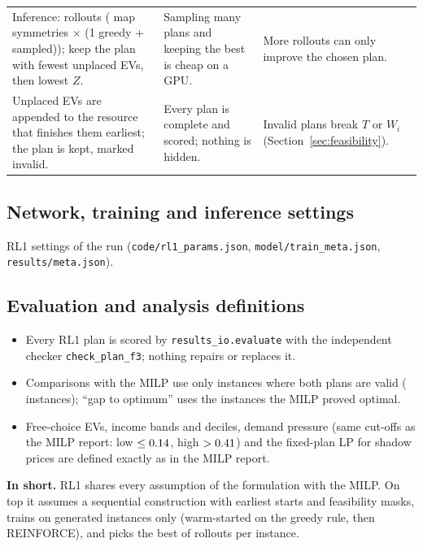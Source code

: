 \documentclass[11pt,a4paper]{article}
\newcommand{\inshort}[1]{\begin{insum}\textbf{In short.} #1\end{insum}}
\begin{document}
\begin{xltabular}{\textwidth}{@{}>{\raggedright\arraybackslash}p{4.4cm}>{\raggedright\arraybackslash}p{5.2cm}X@{}}
Inference: \Rollouts{} rollouts (\Augment{} map symmetries $\times$ (1 greedy + \Samples{} sampled)); keep the plan with fewest unplaced EVs, then lowest $Z$. & Sampling many plans and keeping the best is cheap on a GPU. & More rollouts can only improve the chosen plan. \\
Unplaced EVs are appended to the resource that finishes them earliest; the plan is kept, marked invalid. & Every plan is complete and scored; nothing is hidden. & Invalid plans break $T$ or $W_i$ (Section~\ref{sec:feasibility}). \\
\bottomrule
\end{xltabular}

\subsection{Network, training and inference settings}
\begin{table}[H]
\centering\small
\caption{RL1 settings of the run (\texttt{code/rl1\_params.json}, \texttt{model/train\_meta.json}, \texttt{results/meta.json}).}
\label{tab:settings}

\end{table}

\subsection{Evaluation and analysis definitions}
\begin{itemize}
  \item Every RL1 plan is scored by \texttt{results\_io.evaluate} with the independent checker \texttt{check\_plan\_f3}; nothing repairs or replaces it.
  \item Comparisons with the MILP use only instances where both plans are valid (\NBoth{} instances); ``gap to optimum'' uses the \NGapOpt{} instances the MILP proved optimal.
  \item Free-choice EVs, income bands and deciles, demand pressure (same cut-offs as the MILP report: low $\le0.14$, high $>0.41$) and the fixed-plan LP for shadow prices are defined exactly as in the MILP report.
\end{itemize}

\inshort{RL1 shares every assumption of the formulation with the MILP. On top it assumes a sequential construction with earliest starts and feasibility masks, trains on generated instances only (warm-started on the greedy rule, then REINFORCE), and picks the best of \Rollouts{} rollouts per instance.}
\end{document}
